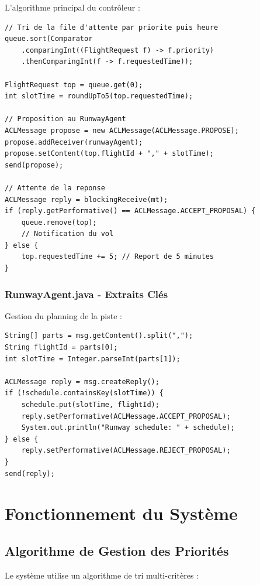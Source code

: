 \documentclass[12pt,a4paper]{article}
\begin{document}
L'algorithme principal du contrôleur :

\begin{lstlisting}[caption=ControllerAgent.java - Tri et attribution]
// Tri de la file d'attente par priorite puis heure
queue.sort(Comparator
    .comparingInt((FlightRequest f) -> f.priority)
    .thenComparingInt(f -> f.requestedTime));

FlightRequest top = queue.get(0);
int slotTime = roundUpTo5(top.requestedTime);

// Proposition au RunwayAgent
ACLMessage propose = new ACLMessage(ACLMessage.PROPOSE);
propose.addReceiver(runwayAgent);
propose.setContent(top.flightId + "," + slotTime);
send(propose);

// Attente de la reponse
ACLMessage reply = blockingReceive(mt);
if (reply.getPerformative() == ACLMessage.ACCEPT_PROPOSAL) {
    queue.remove(top);
    // Notification du vol
} else {
    top.requestedTime += 5; // Report de 5 minutes
}
\end{lstlisting}

\subsubsection{RunwayAgent.java - Extraits Clés}

Gestion du planning de la piste :

\begin{lstlisting}[caption=RunwayAgent.java - Verification de disponibilite]
String[] parts = msg.getContent().split(",");
String flightId = parts[0];
int slotTime = Integer.parseInt(parts[1]);

ACLMessage reply = msg.createReply();
if (!schedule.containsKey(slotTime)) {
    schedule.put(slotTime, flightId);
    reply.setPerformative(ACLMessage.ACCEPT_PROPOSAL);
    System.out.println("Runway schedule: " + schedule);
} else {
    reply.setPerformative(ACLMessage.REJECT_PROPOSAL);
}
send(reply);
\end{lstlisting}

\section{Fonctionnement du Système}

\subsection{Algorithme de Gestion des Priorités}

Le système utilise un algorithme de tri multi-critères :
\end{document}
